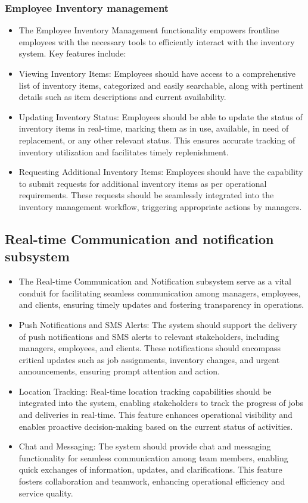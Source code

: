 \documentclass{article}
\begin{document}
	\subsubsection*{Employee Inventory management}	
	\begin{itemize}
	    \item The Employee Inventory Management functionality empowers frontline employees with the necessary tools to efficiently interact with the inventory system. Key features include:
	    \item Viewing Inventory Items: Employees should have access to a comprehensive list of inventory items, categorized and easily searchable, along with pertinent details such as item descriptions and current availability.
	    \item Updating Inventory Status: Employees should be able to update the status of inventory items in real-time, marking them as in use, available, in need of replacement, or any other relevant status. This ensures accurate tracking of inventory utilization and facilitates timely replenishment.
	    \item Requesting Additional Inventory Items: Employees should have the capability to submit requests for additional inventory items as per operational requirements. These requests should be seamlessly integrated into the inventory management workflow, triggering appropriate actions by managers.
	\end{itemize}
	\subsection*{Real-time Communication and notification subsystem}	
	\begin{itemize}
	    \item The Real-time Communication and Notification subsystem serve as a vital conduit for facilitating seamless communication among managers, employees, and clients, ensuring timely updates and fostering transparency in operations.
	    \item Push Notifications and SMS Alerts: The system should support the delivery of push notifications and SMS alerts to relevant stakeholders, including managers, employees, and clients. These notifications should encompass critical updates such as job assignments, inventory changes, and urgent announcements, ensuring prompt attention and action.
	    \item Location Tracking: Real-time location tracking capabilities should be integrated into the system, enabling stakeholders to track the progress of jobs and deliveries in real-time. This feature enhances operational visibility and enables proactive decision-making based on the current status of activities.
	    \item Chat and Messaging: The system should provide chat and messaging functionality for seamless communication among team members, enabling quick exchanges of information, updates, and clarifications. This feature fosters collaboration and teamwork, enhancing operational efficiency and service quality.
	\end{itemize}
\end{document}
